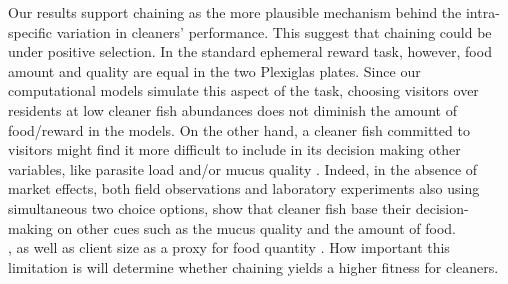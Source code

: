 \documentclass[]{rsos}%
\begin{document}
Our results support chaining as the more plausible mechanism behind the
intra-specific variation in cleaners' performance. This suggest
that chaining could be under positive selection. In the standard ephemeral
reward task, however, food amount and quality are equal in the
two Plexiglas plates. Since our computational models simulate this aspect of
the task, choosing visitors over residents at low cleaner fish abundances
does not diminish the amount of food/reward in the models.
On the other hand, a cleaner fish committed to visitors might find it more difficult
to include in its decision making other variables, like parasite load
and/or mucus quality \citep{roche_Client_2021}. Indeed, in the absence of
market effects, both field observations and laboratory experiments also
using simultaneous two choice options, show that cleaner fish base their
decision-making on other cues such as the mucus quality and the amount of food.\\
\citep{triki_Fluctuations_2019, grutter_Cleaner_2004}, as well as client size
as a proxy for food quantity \citep{wismer_Cuebased_2019, grutter_Does_2005}.
How important this limitation is will determine whether chaining yields a higher
fitness for cleaners.
\end{document}
